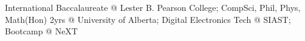 \begin{par}
  International Baccalaureate @ Lester B. Pearson College;
  CompSci, Phil, Phys, Math(Hon) 2yrs @ University of Alberta;
  Digital Electronics Tech @ SIAST;
  Bootcamp @ NeXT
\end{par}
